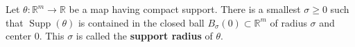 Let $\theta: \mathbb{R}^m \to \mathbb{R}$ be a map having compact support. There is a smallest $\sigma \geqslant 0$ such that $\operatorname{Supp}(\theta)$ is contained in the closed ball $B_\sigma(0) \subset \mathbb{R}^m$ of radius $\sigma$ and center $0$. This $\sigma$ is called the \textbf{support radius} of $\theta$.
